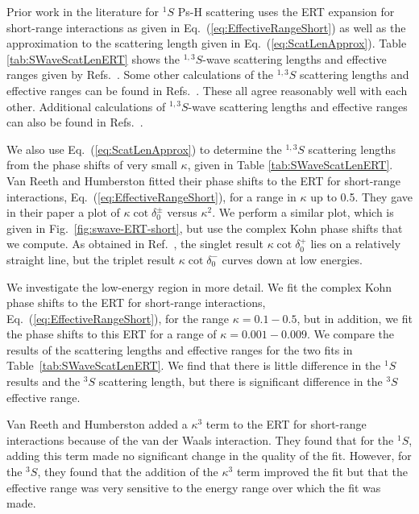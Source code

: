 \documentclass[preprint,showpacs,showkeys,preprintnumbers,amsmath,amssymb,longbibliography,pra,aps]{revtex4-1}
\begin{document}
{Prior work in the literature for $^1S$ Ps-H scattering
\cite{Blackwood2002,Ivanov2002,VanReeth2003}
uses the ERT expansion for short-range interactions as
given in Eq.~(\ref{eq:EffectiveRangeShort}) as well as the
approximation to the scattering length given in Eq.~(\ref{eq:ScatLenApprox}).
Table \ref{tab:SWaveScatLenERT} shows the $^{1,3}S$-wave
scattering lengths and effective ranges given by
Refs.~\cite{Blackwood2002,Ivanov2002,VanReeth2003,Walters2004}.
Some other calculations of the $^{1,3}S$ scattering lengths and
effective ranges can be found in
Refs.~\cite{Sinha2000,Ivanov2001,Chiesa2002,Ivanov2002}.
These all agree reasonably well with each other. Additional calculations
of $^{1,3}S$-wave scattering lengths and effective ranges can also be found in
Refs.~\cite{Hara1975,Page1976,Drachman1975,
Drachman1976,Campbell1998,Adhikari1999,Adhikari2001b}.

We also use Eq.~(\ref{eq:ScatLenApprox}) to determine the $^{1,3}S$
scattering lengths from the phase shifts of very small $\kappa$, given
in Table \ref{tab:SWaveScatLenERT}. Van Reeth and Humberston
\cite{VanReeth2003} fitted their phase shifts to the ERT for short-range
interactions, Eq.~(\ref{eq:EffectiveRangeShort}), for a range in $\kappa$
up to 0.5. They gave in their paper a plot of $\kappa \cot \delta_0^\pm$
versus $\kappa^2$. We perform a similar plot, which is given in
Fig.~\ref{fig:swave-ERT-short}, but use the complex Kohn phase shifts
that we compute. As obtained in Ref.~\cite{VanReeth2003}, the singlet
result $\kappa \cot \delta_0^+$ lies on a relatively straight line, but
the triplet result $\kappa \cot \delta_0^-$ curves down at low energies.

We investigate the low-energy region in more detail. We fit the
complex Kohn phase shifts to the ERT for short-range interactions,
Eq.~(\ref{eq:EffectiveRangeShort}), for the range $\kappa = 0.1 - 0.5$, but
in addition, we fit the phase shifts to this ERT for a range of
$\kappa = 0.001 - 0.009$. We compare the results of the scattering lengths
and effective ranges for the two fits in Table~\ref{tab:SWaveScatLenERT}.
We find that there is little difference in the $^1S$ results and the $^3S$
scattering length, but there is significant difference in the $^3S$
effective range.

Van Reeth and Humberston \cite{VanReeth2003} added a $\kappa^3$ term to the
ERT for short-range interactions because of the van der Waals interaction.
They found that for the $^1S$, adding this term made no significant change in the
quality of the fit. However, for the $^3S$, they found that the addition of
the $\kappa^3$ term improved the fit but that the effective range was very sensitive
to the energy range over which the fit was made.

}
\end{document}
